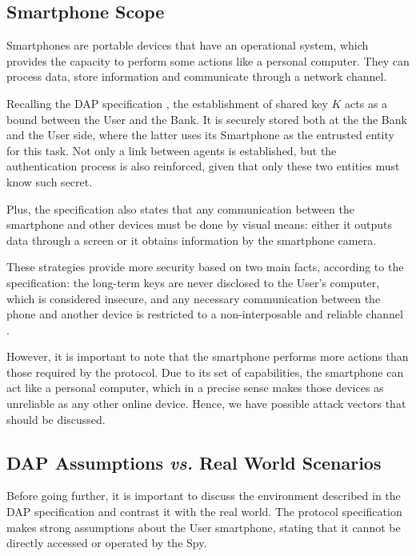 \subsection{Smartphone Scope}
\label{sec:smartphone-first-analysis}
Smartphones are portable devices that have an operational system, which provides the capacity to perform some actions like a personal computer. They can process data, store information and communicate through a network channel.

Recalling the DAP specification \cite[Ch. 4]{Peotta2012}, the establishment of shared key $K$ acts as a bound between the User and the Bank. It is securely stored both at the the Bank and the User side, where the latter uses its Smartphone as the entrusted entity for this task. Not only a link between agents is established, but the authentication process is also reinforced, given that only these two entities must know such secret.

Plus, the specification also states that any communication between the smartphone and other devices must be done by visual means: either it outputs data through a screen or it obtains information by the smartphone camera.

These strategies provide more security based on two main facts, according to the specification: the long-term keys are never disclosed to the User's computer, which is considered insecure, and any necessary communication between the phone and another device is restricted to a non-interposable and reliable channel \cite{Peotta2012}.

However, it is important to note that the smartphone performs more actions than those required by the protocol. Due to its set of capabilities, the smartphone can act like a personal computer, which in a precise sense makes those devices as unreliable as any other online device. Hence, we have possible attack vectors that should be discussed.



\subsection{DAP Assumptions \textit{vs.} Real World Scenarios}
\label{sec:dap-assumptions}
Before going further, it is important to discuss the environment described in the DAP specification and contrast it with the real world. The protocol specification makes strong assumptions about the User smartphone, stating that it cannot be directly accessed or operated by the Spy.


